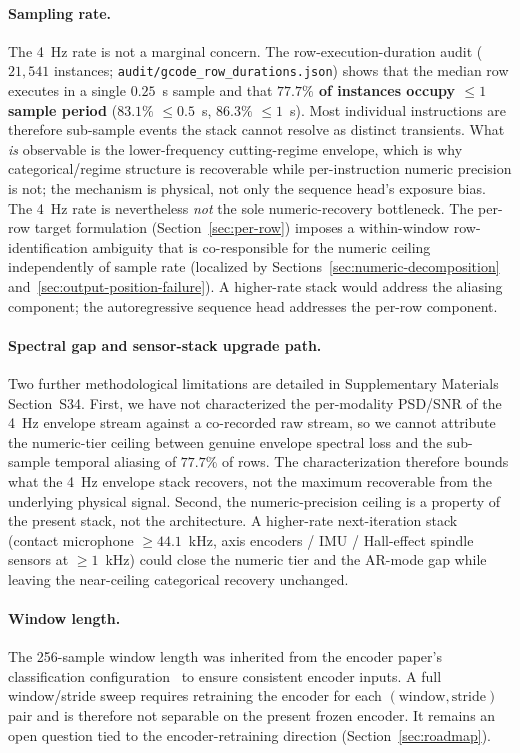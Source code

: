 \documentclass[sensors,article,submit,moreauthors,pdftex]{Definitions/mdpi}
\begin{document}
\paragraph{Sampling rate.} The 4~Hz rate is not a marginal concern. The row-execution-duration audit ($21{,}541$ instances; \texttt{audit/gcode\_row\_durations.json}) shows that the median row executes in a single $0.25$~s sample and that \textbf{$77.7\%$ of instances occupy $\le\!1$ sample period} ($83.1\%$ $\le\!0.5$~s, $86.3\%$ $\le\!1$~s). Most individual instructions are therefore sub-sample events the stack cannot resolve as distinct transients. What \emph{is} observable is the lower-frequency cutting-regime envelope, which is why categorical/regime structure is recoverable while per-instruction numeric precision is not; the mechanism is physical, not only the sequence head's exposure bias. The 4~Hz rate is nevertheless \emph{not} the sole numeric-recovery bottleneck. The per-row target formulation (Section~\ref{sec:per-row}) imposes a within-window row-identification ambiguity that is co-responsible for the numeric ceiling independently of sample rate (localized by Sections~\ref{sec:numeric-decomposition} and~\ref{sec:output-position-failure}). A higher-rate stack would address the aliasing component; the autoregressive sequence head addresses the per-row component.

\paragraph{Spectral gap and sensor-stack upgrade path.} Two further methodological limitations are detailed in Supplementary Materials Section~S34. First, we have not characterized the per-modality PSD/SNR of the 4~Hz envelope stream against a co-recorded raw stream, so we cannot attribute the numeric-tier ceiling between genuine envelope spectral loss and the sub-sample temporal aliasing of $77.7\%$ of rows. The characterization therefore bounds what the 4~Hz envelope stack recovers, not the maximum recoverable from the underlying physical signal. Second, the numeric-precision ceiling is a property of the present stack, not the architecture. A higher-rate next-iteration stack (contact microphone $\geq 44.1$~kHz, axis encoders / IMU / Hall-effect spindle sensors at $\geq 1$~kHz) could close the numeric tier and the AR-mode gap while leaving the near-ceiling categorical recovery unchanged.

\paragraph{Window length.} The 256-sample window length was inherited from the encoder paper's classification configuration~\cite{encoder_paper} to ensure consistent encoder inputs. A full window/stride sweep requires retraining the encoder for each $(\text{window}, \text{stride})$ pair and is therefore not separable on the present frozen encoder. It remains an open question tied to the encoder-retraining direction (Section~\ref{sec:roadmap}).
\end{document}
